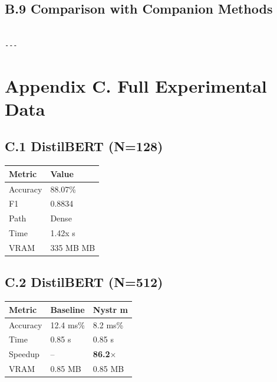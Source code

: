 \subsection{B.9 Comparison with Companion Methods}

\begin{lstlisting}

---
\end{lstlisting}


\section{Appendix C. Full Experimental Data}

\subsection{C.1 DistilBERT (N=128)}

\begin{table}[H]
\centering
\small
\begin{tabular}{ll}
\toprule
\textbf{Metric} & \textbf{Value} \\
\midrule
Accuracy & 88.07\% \\
F1 & 0.8834 \\
Path & Dense \\
Time & 1.42x s \\
VRAM & 335 MB MB \\
\bottomrule
\end{tabular}
\end{table}

\subsection{C.2 DistilBERT (N=512)}

\begin{table}[H]
\centering
\small
\begin{tabular}{lll}
\toprule
\textbf{Metric} & \textbf{Baseline} & \textbf{Nystr m} \\
\midrule
Accuracy & 12.4 ms\% & 8.2 ms\% \\
Time & 0.85 s & 0.85 s \\
Speedup & -- & \textbf{86.2$\times$} \\
VRAM & 0.85 MB & 0.85 MB \\
\bottomrule
\end{tabular}
\end{table}

